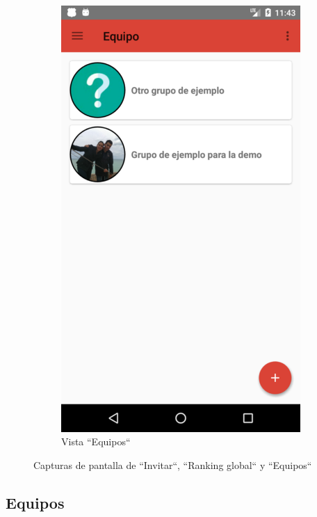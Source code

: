 \documentclass[twoside]{report}
\begin{document}
\begin{figure}[H]
\begin{center}
\begin{subfigure}[t]{.3\linewidth}
		\includegraphics[scale=0.25]{images/userguide/13.png}
		\caption{Vista “Equipos“}
	\end{subfigure}\hspace{2mm}%
\caption{Capturas de pantalla de “Invitar“, “Ranking global“ y “Equipos“}
\end{center}
\end{figure}

\subsection{Equipos}
\end{document}
